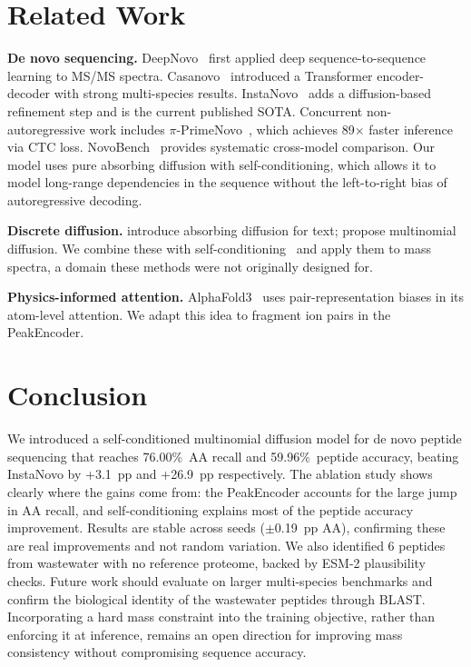 \documentclass[10pt,twocolumn]{article}
\begin{document}
\section{Related Work}

\textbf{De novo sequencing.}
DeepNovo~\citep{tran2017deepnovo} first applied deep sequence-to-sequence learning to MS/MS spectra.
Casanovo~\citep{casanovo2023} introduced a Transformer encoder-decoder with strong multi-species results.
InstaNovo~\citep{instanovo2024} adds a diffusion-based refinement step and is the current published SOTA.
Concurrent non-autoregressive work includes $\pi$-PrimeNovo~\citep{zhang2025primenovo}, which achieves
89$\times$ faster inference via CTC loss.
NovoBench~\citep{zhou2024novobench} provides systematic cross-model comparison.
Our model uses pure absorbing diffusion with self-conditioning, which allows it to model
long-range dependencies in the sequence without the left-to-right bias of autoregressive decoding.

\textbf{Discrete diffusion.}
\citet{austin2021structured} introduce absorbing diffusion for text; \citet{hoogeboom2021argmax}
propose multinomial diffusion. We combine these with self-conditioning~\citep{chen2022analog}
and apply them to mass spectra, a domain these methods were not originally designed for.

\textbf{Physics-informed attention.}
AlphaFold3~\citep{abramson2024alphafold3} uses pair-representation biases in its atom-level
attention. We adapt this idea to fragment ion pairs in the PeakEncoder.

\section{Conclusion}

We introduced a self-conditioned multinomial diffusion model for de novo peptide sequencing that
reaches 76.00\%~AA recall and 59.96\%~peptide accuracy, beating InstaNovo by +3.1~pp and
+26.9~pp respectively.
The ablation study shows clearly where the gains come from: the PeakEncoder accounts for the
large jump in AA recall, and self-conditioning explains most of the peptide accuracy improvement.
Results are stable across seeds ($\pm$0.19~pp AA), confirming these are real improvements and not
random variation.
We also identified 6 peptides from wastewater with no reference proteome, backed by ESM-2
plausibility checks.
Future work should evaluate on larger multi-species benchmarks and confirm the biological
identity of the wastewater peptides through BLAST. Incorporating a hard mass constraint into
the training objective, rather than enforcing it at inference, remains an open direction for
improving mass consistency without compromising sequence accuracy.
\end{document}
